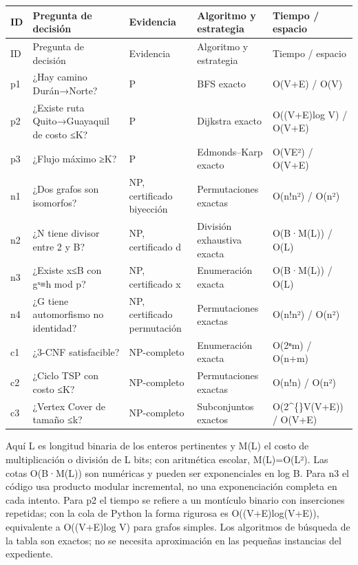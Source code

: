 \documentclass[12pt,a4paper]{article}
\begin{document}
\setlength{\tabcolsep}{2pt}
\begin{longtable}{|>{\raggedright\arraybackslash}p{0.65cm}|>{\raggedright\arraybackslash}p{4.7cm}|>{\raggedright\arraybackslash}p{2.6cm}|>{\raggedright\arraybackslash}p{3.2cm}|>{\raggedright\arraybackslash}p{3.3cm}|}\hline
ID & Pregunta de decisión & Evidencia & Algoritmo y estrategia & Tiempo / espacio \\ \hline
\endfirsthead ID & Pregunta de decisión & Evidencia & Algoritmo y estrategia & Tiempo / espacio \\ \hline \endhead
p1 & ¿Hay camino Durán→Norte? & P & BFS exacto & O(V+E) / O(V) \\ \hline
p2 & ¿Existe ruta Quito→Guayaquil de costo ≤K? & P & Dijkstra exacto & O((V+E)log V) / O(V+E) \\ \hline
p3 & ¿Flujo máximo ≥K? & P & Edmonds–Karp exacto & O(VE²) / O(V+E) \\ \hline
n1 & ¿Dos grafos son isomorfos? & NP, certificado biyección & Permutaciones exactas & O(n!n²) / O(n²) \\ \hline
n2 & ¿N tiene divisor entre 2 y B? & NP, certificado d & División exhaustiva exacta & O(B·M(L)) / O(L) \\ \hline
n3 & ¿Existe x≤B con gˣ≡h mod p? & NP, certificado x & Enumeración exacta & O(B·M(L)) / O(L) \\ \hline
n4 & ¿G tiene automorfismo no identidad? & NP, certificado permutación & Permutaciones exactas & O(n!n²) / O(n²) \\ \hline
c1 & ¿3-CNF satisfacible? & NP-completo & Enumeración exacta & O(2ⁿm) / O(n+m) \\ \hline
c2 & ¿Ciclo TSP con costo ≤K? & NP-completo & Permutaciones exactas & O(n!n) / O(n²) \\ \hline
c3 & ¿Vertex Cover de tamaño ≤k? & NP-completo & Subconjuntos exactos & O(2\textasciicircum\{\}V(V+E)) / O(V+E) \\ \hline
\end{longtable}

Aquí L es longitud binaria de los enteros pertinentes y M(L) el costo de multiplicación o división de L bits; con aritmética escolar, M(L)=O(L²). Las cotas O(B·M(L)) son numéricas y pueden ser exponenciales en log B. Para n3 el código usa producto modular incremental, no una exponenciación completa en cada intento. Para p2 el tiempo se refiere a un montículo binario con inserciones repetidas; con la cola de Python la forma rigurosa es O((V+E)log(V+E)), equivalente a O((V+E)log V) para grafos simples. Los algoritmos de búsqueda de la tabla son exactos; no se necesita aproximación en las pequeñas instancias del expediente.
\end{document}
